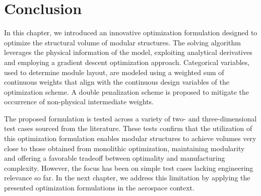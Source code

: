 \section{Conclusion}
In this chapter, we introduced an innovative optimization formulation designed to optimize the structural volume of modular structures. The solving algorithm leverages the physical information of the model, exploiting analytical derivatives and employing a gradient descent optimization approach. Categorical variables, used to determine module layout, are modeled using a weighted sum of continuous weights that align with the continuous design variables of the optimization scheme. A double penalization scheme is proposed to mitigate the occurrence of non-physical intermediate weights.

The proposed formulation is tested across a variety of two- and three-dimensional test cases sourced from the literature. These tests confirm that the utilization of this optimization formulation enables modular structures to achieve volumes very close to those obtained from monolithic optimization, maintaining modularity and offering a favorable tradeoff between optimality and manufacturing complexity. However, the focus has been on simple test cases lacking engineering relevance so far. In the next chapter, we address this limitation by applying the presented optimization formulations in the aerospace context.
